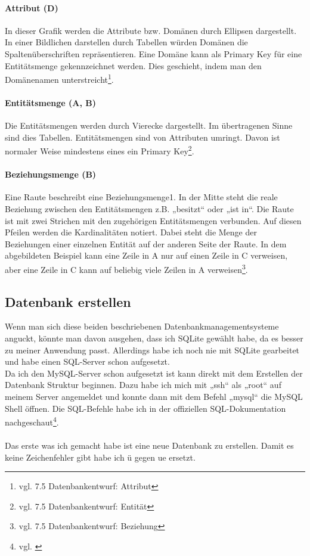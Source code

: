 \documentclass[a4paper, 12pt]{article}
\theoremstyle{plain}
\theoremstyle{definition}
\begin{document}
	\paragraph{Attribut (D)} In dieser Grafik werden die Attribute bzw. Domänen durch Ellipsen dargestellt. In einer Bildlichen darstellen durch Tabellen würden Domänen die Spaltenüberschriften repräsentieren. Eine Domäne kann als Primary Key für eine Entitätsmenge gekennzeichnet werden. Dies geschieht, indem man den Domänenamen unterstreicht\footnote{vgl. \cite{Jarosch2010} 7.5 Datenbankentwurf: Attribut}.
	
	\paragraph{Entitätsmenge (A, B)} Die Entitätsmengen werden durch Vierecke dargestellt. Im übertragenen Sinne sind dies Tabellen. Entitätsmengen sind von Attributen umringt. Davon ist normaler Weise mindestens eines ein Primary Key\footnote{vgl. \cite{Jarosch2010} 7.5 Datenbankentwurf: Entität}.
	
	\paragraph{Beziehungsmenge (B)} Eine Raute beschreibt eine Beziehungsmenge1. In der Mitte steht die reale Beziehung zwischen den Entitätsmengen z.B. „besitzt“ oder „ist in“. Die Raute ist mit zwei Strichen mit den zugehörigen Entitätsmengen verbunden.  Auf diesen Pfeilen werden die Kardinalitäten notiert. Dabei steht die Menge der Beziehungen einer einzelnen Entität auf der anderen Seite der Raute. In dem abgebildeten Beispiel kann eine Zeile in A nur auf einen Zeile in C verweisen, aber eine Zeile in C kann auf beliebig viele Zeilen in A verweisen\footnote{vgl. \cite{Jarosch2010} 7.5 Datenbankentwurf: Beziehung}. 
	
	\subsection{Datenbank erstellen}
	\label{sec:dbErst}
	
	Wenn man sich diese beiden beschriebenen Datenbankmanagementsysteme anguckt, könnte man davon ausgehen, dass ich SQLite gewählt habe, da es besser zu meiner Anwendung passt. Allerdings habe ich noch nie mit SQLite gearbeitet und habe einen SQL-Server schon aufgesetzt.\\
Da ich den MySQL-Server schon aufgesetzt ist kann direkt mit dem Erstellen der Datenbank Struktur beginnen. Dazu habe ich mich mit „ssh“ als „root“ auf meinem Server angemeldet und konnte dann mit dem Befehl „mysql“ die MySQL Shell öffnen. Die SQL-Befehle habe ich in der offiziellen SQL-Dokumentation nachgeschaut\footnote{vgl. \cite{sqlDocu}}.\\ \\
Das erste was ich gemacht habe ist eine neue Datenbank zu erstellen. Damit es keine Zeichenfehler gibt habe ich ü gegen ue ersetzt.
	
\end{document}
